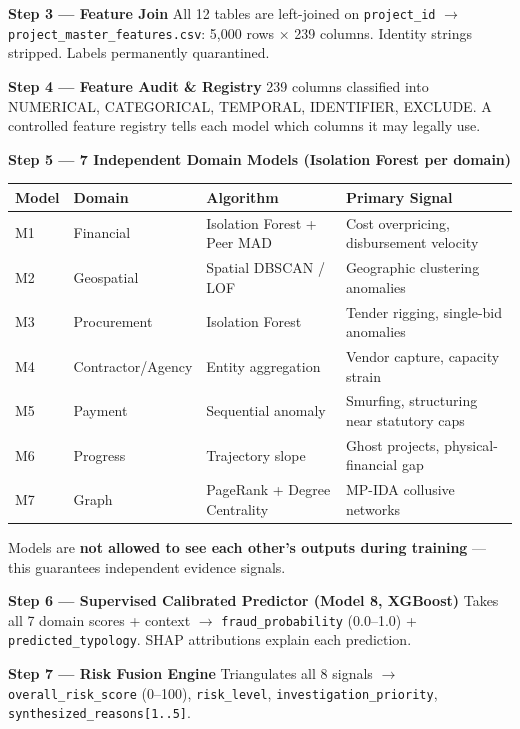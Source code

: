 \documentclass[11pt,a4paper]{article}
\begin{document}
\textbf{Step 3 --- Feature Join}
All 12 tables are left-joined on \texttt{project\_id} $\rightarrow$ \texttt{project\_master\_features.csv}: 5,000 rows × 239 columns. Identity strings stripped. Labels permanently quarantined.

\textbf{Step 4 --- Feature Audit \& Registry}
239 columns classified into NUMERICAL, CATEGORICAL, TEMPORAL, IDENTIFIER, EXCLUDE. A controlled feature registry tells each model which columns it may legally use.

\textbf{Step 5 --- 7 Independent Domain Models (Isolation Forest per domain)}

\begin{table}[htbp]
\centering
\small
\begin{tabularx}{\textwidth}{l l l Y}
\toprule
\textbf{Model} & \textbf{Domain} & \textbf{Algorithm} & \textbf{Primary Signal} \\
\midrule
M1 & Financial & Isolation Forest + Peer MAD & Cost overpricing, disbursement velocity \\
M2 & Geospatial & Spatial DBSCAN / LOF & Geographic clustering anomalies \\
M3 & Procurement & Isolation Forest & Tender rigging, single-bid anomalies \\
M4 & Contractor/Agency & Entity aggregation & Vendor capture, capacity strain \\
M5 & Payment & Sequential anomaly & Smurfing, structuring near statutory caps \\
M6 & Progress & Trajectory slope & Ghost projects, physical-financial gap \\
M7 & Graph & PageRank + Degree Centrality & MP-IDA collusive networks \\
\bottomrule
\end{tabularx}
\end{table}


Models are \textbf{not allowed to see each other's outputs during training} --- this guarantees independent evidence signals.

\textbf{Step 6 --- Supervised Calibrated Predictor (Model 8, XGBoost)}
Takes all 7 domain scores + context $\rightarrow$ \texttt{fraud\_probability} (0.0–1.0) + \texttt{predicted\_typology}. SHAP attributions explain each prediction.

\textbf{Step 7 --- Risk Fusion Engine}
Triangulates all 8 signals $\rightarrow$ \texttt{overall\_risk\_score} (0–100), \texttt{risk\_level}, \texttt{investigation\_priority}, \texttt{synthesized\_reasons[1..5]}.
\end{document}
